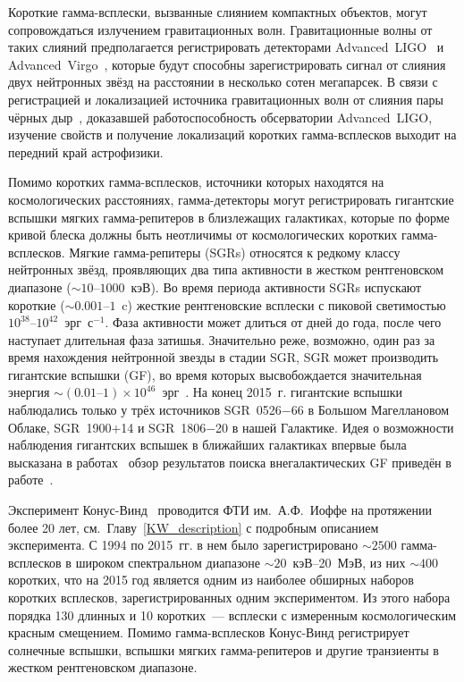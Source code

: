 Короткие гамма-всплески, вызванные слиянием компактных объектов, могут сопровождаться излучением гравитационных волн. 
Гравитационные волны от таких слияний предполагается регистрировать 
детекторами Advanced~LIGO~\citep{LIGO_2015CQGra} и Advanced~Virgo~\citep{Acernese_2015CQGra}, 
которые будут способны зарегистрировать сигнал от слияния
двух нейтронных звёзд на расстоянии в несколько сотен мегапарсек. 
В связи с регистрацией и локализацией источника гравитационных
волн от слияния пары чёрных дыр~\citep{Abbott_2016PhRvL}, доказавшей работоспособность обсерватории 
Advanced~LIGO, изучение свойств и получение локализаций коротких гамма-всплесков 
выходит на передний край астрофизики.

Помимо коротких гамма-всплесков, источники которых находятся на космологических расстояниях,
гамма-детекторы могут регистрировать гигантские вспышки мягких гамма-репитеров 
в близлежащих галактиках, которые по форме кривой блеска должны быть неотличимы от 
космологических коротких гамма-всплесков. Мягкие гамма-репитеры (SGRs) относятся 
к редкому классу нейтронных звёзд, проявляющих 
два типа активности в жестком рентгеновском диапазоне ($\sim 10\textrm{--}1000$~кэВ). 
Во время периода активности SGRs испускают короткие ($\sim0.001\textrm{--}1$~c) жесткие рентгеновские всплески 
с пиковой светимостью $10^{38}\textrm{--}10^{42}$~эрг~с$^{-1}$. Фаза активности может длиться 
от дней до года, после чего наступает длительная фаза затишья. Значительно реже, 
возможно, один раз за время нахождения нейтронной звезды в стадии SGR, SGR может 
производить гигантские вспышки (GF), во время которых высвобождается значительная 
энергия $\sim(0.01\textrm{--}1)\times 10^{46}$~эрг~\citep[см. обзор][]{Mereghetti2013}.
На конец 2015~г. гигантские вспышки наблюдались только у трёх источников 
SGR~0526$-$66 в Большом Магеллановом Облаке, SGR~1900$+$14 и SGR~1806$-$20 в нашей Галактике.
Идея о возможности наблюдения гигантских вспышек в ближайших галактиках впервые была высказана 
в работах~\citep{Mazets1981,Mazets1982} обзор результатов поиска 
внегалактических GF приведён в работе~\citep{Hurley2011}.

Эксперимент Конус-Винд~\citep{Aptekar_1995SSR} проводится ФТИ им.~А.Ф.~Иоффе на протяжении более 20 лет, 
см.~Главу~\ref{KW_description} с подробным описанием эксперимента.
С 1994 по 2015~гг. в нем  было зарегистрировано 
$\sim 2500$ гамма-всплесков в широком спектральном диапазоне $\sim 20$~кэВ--20~МэВ,
из них $\sim 400$ коротких, что на 2015 год является 
одним из наиболее обширных наборов коротких всплесков, зарегистрированных 
одним экспериментом. Из этого набора порядка 130 длинных и 10 коротких~--- всплески 
с измеренным космологическим красным смещением. 
Помимо гамма-всплесков Конус-Винд регистрирует солнечные вспышки, вспышки мягких гамма-репитеров 
и другие транзиенты в жестком рентгеновском диапазоне.


